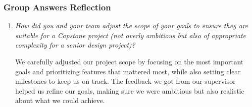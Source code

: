 \documentclass{article}
\begin{document}
\subsubsection*{Group Answers Reflection}
\begin{enumerate}
  \item \textit{How did you and your team adjust the scope of your goals to ensure they are suitable for a Capstone project (not overly 
  ambitious but also of appropriate complexity for a senior design project)?}
  
  We carefully adjusted our project scope by focusing on the most important goals and prioritizing features that mattered most, while also 
  setting clear milestones to keep us on track. The feedback we got from our supervisor helped us refine our goals, making sure we were ambitious but
  also realistic about what we could achieve.
    
\end{enumerate}
    
\end{document}
